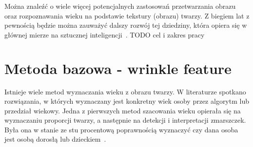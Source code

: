 \documentclass[a4paper,twoside,12pt]{book}
\begin{document}
    Można znaleźć o wiele więcej potencjalnych zastosowań przetwarzania obrazu oraz rozpoznawania wieku na podstawie
    tekstury (obrazu) twarzy.
    Z biegiem lat z pewnością będzie można zauważyć dalszy rozwój tej dziedziny, która
    opiera się w głównej mierze na sztucznej inteligencji~\cite{computerVision}.
    TODO cel i zakres pracy

    \chapter{Metoda bazowa - wrinkle feature}\label{ch:metoda-bazowa---wrinkle-feature}

    Istnieje wiele metod wyznaczania wieku z obrazu twarzy.
    W literaturze spotkano rozwiązania, w których wyznaczany
    jest konkretny
    wiek osoby przez algorytm lub przedział wiekowy.
    Jedna z pierwszych metod szacowania wieku opierała się na wyznaczaniu proporcji twarzy, a następnie na detekcji i
    interpretacji zmarszczek.
    Była ona w stanie ze stu procentową poprawnością wyznaczyć czy dana osoba jest osobą
    dorosłą lub
    dzieckiem~\cite{kwonLobo}.
\end{document}
